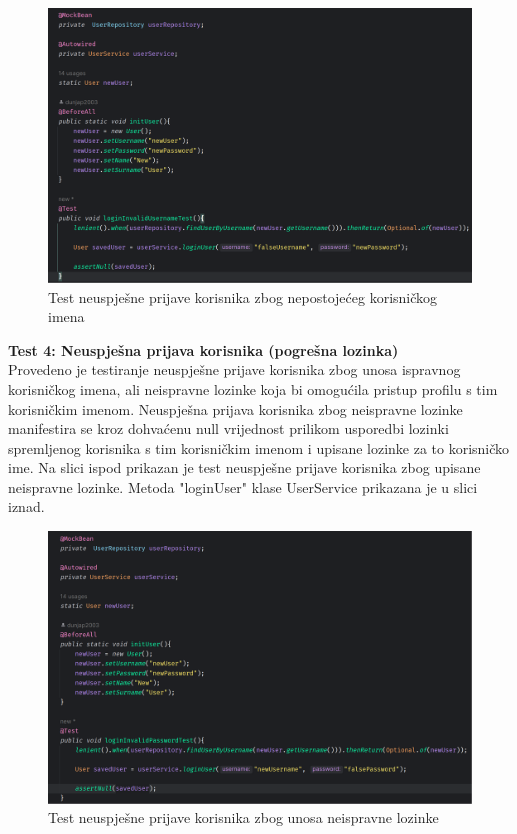 				\begin{figure}[H]
			\includegraphics[scale=0.4]{slike/loginInvalidUsernameTest.PNG} %
			\centering
			\caption{Test neuspješne prijave korisnika zbog nepostojećeg korisničkog imena}
			\label{Test neuspješne prijave korisnika zbog nepostojećeg korisničkog imena}
		\end{figure}
		
\textbf{Test 4: Neuspješna prijava korisnika (pogrešna lozinka)} \\
Provedeno je testiranje neuspješne prijave korisnika zbog unosa ispravnog korisničkog imena, ali neispravne lozinke koja bi omogućila pristup profilu s tim korisničkim imenom. Neuspješna prijava korisnika zbog neispravne lozinke manifestira se kroz dohvaćenu null vrijednost prilikom usporedbi lozinki spremljenog korisnika s tim korisničkim imenom i upisane lozinke za to korisničko ime. Na slici ispod prikazan je test neuspješne prijave korisnika zbog upisane neispravne lozinke. Metoda "loginUser" klase UserService prikazana je u slici iznad.

				\begin{figure}[H]
			\includegraphics[scale=0.4]{slike/loginInvalidPasswordTest.PNG} %
			\centering
			\caption{Test neuspješne prijave korisnika zbog unosa neispravne lozinke}
			\label{Test neuspješne prijave korisnika zbog unosa neispravne lozinke}
		\end{figure}
		
